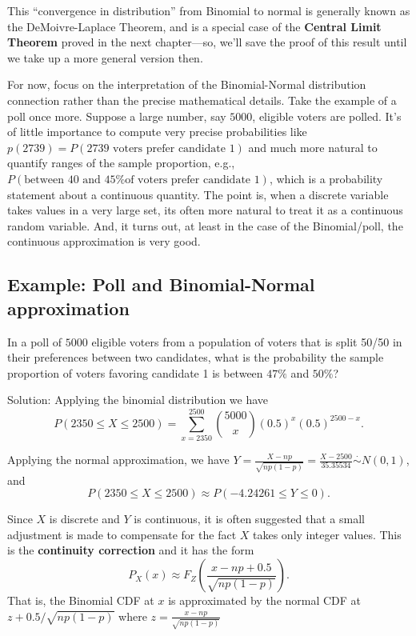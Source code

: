 \documentclass[]{book}
\begin{document}
This ``convergence in distribution'' from Binomial to normal is
generally known as the DeMoivre-Laplace Theorem, and is a special case
of the \textbf{Central Limit Theorem} proved in the next chapter---so,
we'll save the proof of this result until we take up a more general
version then.

For now, focus on the interpretation of the Binomial-Normal distribution
connection rather than the precise mathematical details. Take the
example of a poll once more. Suppose a large number, say \(5000\),
eligible voters are polled. It's of little importance to compute very
precise probabilities like
\(p(2739) = P(\text{2739 voters prefer candidate 1})\) and much more
natural to quantify ranges of the sample proportion, e.g.,
\(P(\text{between 40 and 45\% of voters prefer candidate 1})\), which is
a probability statement about a continuous quantity. The point is, when
a discrete variable takes values in a very large set, its often more
natural to treat it as a continuous random variable. And, it turns out,
at least in the case of the Binomial/poll, the continuous approximation
is very good.

\subsection{Example: Poll and Binomial-Normal
approximation}\label{example-poll-and-binomial-normal-approximation}

In a poll of \(5000\) eligible voters from a population of voters that
is split 50/50 in their preferences between two candidates, what is the
probability the sample proportion of voters favoring candidate 1 is
between \(47\%\) and \(50\%\)?

Solution: Applying the binomial distribution we have
\[P(2350\leq X \leq 2500) = \sum_{x=2350}^{2500} {5000 \choose x}(0.5)^x(0.5)^{2500-x}.\]

Applying the normal approximation, we have
\(Y=\frac{X - np}{\sqrt{np(1-p)}} = \frac{X - 2500}{35.35534} \stackrel{\cdot}{\sim}N(0,1)\),
and \[P(2350\leq X \leq 2500)\approx P(-4.24261 \leq Y \leq 0).\]

Since \(X\) is discrete and \(Y\) is continuous, it is often suggested
that a small adjustment is made to compensate for the fact \(X\) takes
only integer values. This is the \textbf{continuity correction} and it
has the form
\[P_X(x)\approx F_Z\left(\frac{x-np+0.5}{\sqrt{np(1-p)}}\right).\] That
is, the Binomial CDF at \(x\) is approximated by the normal CDF at
\(z + 0.5/\sqrt{np(1-p)}\) where \(z = \frac{x-np}{\sqrt{np(1-p)}}\)
\end{document}
